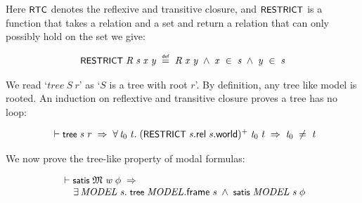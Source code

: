 \documentclass[letterpaper]{article}
\renewcommand{\HOLConst}[1]{{\textsf{\upshape\small #1}}}
\renewcommand{\HOLinline}[1]{\ensuremath{#1}}
\newenvironment{holmath}{\begin{displaymath}\begin{array}{l}}{\end{array}\end{displaymath}\ignorespacesafterend}
\begin{document}
Here \HOLinline{\HOLConst{RTC}} denotes the reflexive and transitive closure, and \HOLinline{\HOLConst{RESTRICT}} is a function that takes a relation and a set and return a relation that can only possibly hold on the set we give:

\begin{holmath}
  \HOLConst{RESTRICT}\;\HOLFreeVar{R}\;\HOLFreeVar{s}\;\HOLFreeVar{x}\;\HOLFreeVar{y}\;\HOLSymConst{\HOLTokenDefEquality{}}\;\HOLFreeVar{R}\;\HOLFreeVar{x}\;\HOLFreeVar{y}\;\HOLSymConst{\HOLTokenConj{}}\;\HOLFreeVar{x}\;\HOLSymConst{\HOLTokenIn{}}\;\HOLFreeVar{s}\;\HOLSymConst{\HOLTokenConj{}}\;\HOLFreeVar{y}\;\HOLSymConst{\HOLTokenIn{}}\;\HOLFreeVar{s}
\end{holmath}

We read `$tree \ S \ r$' as `$S$ is a tree with root $r$'. By definition, any tree like model is rooted. An induction on reflextive and transitive closure proves a tree has no loop:

\begin{holmath}
  \ensuremath{\HOLTokenTurnstile}\HOLConst{tree}\;\HOLFreeVar{s}\;\HOLFreeVar{r}\;\HOLSymConst{\HOLTokenImp{}}\;\HOLSymConst{\HOLTokenForall{}}\HOLBoundVar{t\sb{\mathrm{0}}}\;\HOLBoundVar{t}.\;(\HOLConst{RESTRICT}\;\HOLFreeVar{s}.\HOLFieldName{rel}\;\HOLFreeVar{s}.\HOLFieldName{world})\HOLSymConst{\HOLTokenSupPlus{}}\;\HOLBoundVar{t\sb{\mathrm{0}}}\;\HOLBoundVar{t}\;\HOLSymConst{\HOLTokenImp{}}\;\HOLBoundVar{t\sb{\mathrm{0}}}\;\HOLSymConst{\HOLTokenNotEqual{}}\;\HOLBoundVar{t}
\end{holmath}


We now prove the tree-like property of modal formulas:

\begin{holmath}
  \ensuremath{\HOLTokenTurnstile}\HOLConst{satis}\;\HOLFreeVar{\ensuremath{\mathfrak{M}}}\;\HOLFreeVar{w}\;\HOLFreeVar{\ensuremath{\phi}}\;\HOLSymConst{\HOLTokenImp{}}\\
\;\;\;\;\;\HOLSymConst{\HOLTokenExists{}}\HOLBoundVar{MODEL}\;\HOLBoundVar{s}.\;\HOLConst{tree}\;\HOLBoundVar{MODEL}.\HOLFieldName{frame}\;\HOLBoundVar{s}\;\HOLSymConst{\HOLTokenConj{}}\;\HOLConst{satis}\;\HOLBoundVar{MODEL}\;\HOLBoundVar{s}\;\HOLFreeVar{\ensuremath{\phi}}
\end{holmath}
\end{document}
